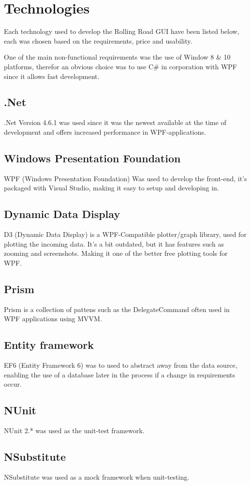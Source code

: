 \chapter{Technologies}

Each technology used to develop the Rolling Road GUI have been listed below, each was chosen based on the requirements, price and usability.

One of the main non-functional requirements was the use of Window 8 \& 10 platforms, therefor an obvious choice was to use C\# in corporation with WPF since it allows fast development.

\section{.Net}

.Net Version 4.6.1 was used since it was the newest available at the time of development and offers increased performance in WPF-applications. 

\section{Windows Presentation Foundation}

WPF (Windows Presentation Foundation) Was used to develop the front-end, it's packaged with Visual Studio, making it easy to setup and developing in.

\section{Dynamic Data Display}

D3 (Dynamic Data Display) is a WPF-Compatible plotter/graph library, used for plotting the incoming data. It's a bit outdated, but it has features such as zooming and screenshots. Making it one of the better free plotting tools for WPF.

\section{Prism}

Prism is a collection of pattens such as the DelegateCommand often used in WPF applications using MVVM.

\section{Entity framework}

EF6 (Entity Framework 6) was to used to abstract away from the data source, enabling the use of a database later in the process if a change in requirements occur.

\section{NUnit}

NUnit 2.* was used as the unit-test framework.

\section{NSubstitute}

NSubstitute was used as a mock framework when unit-testing.
